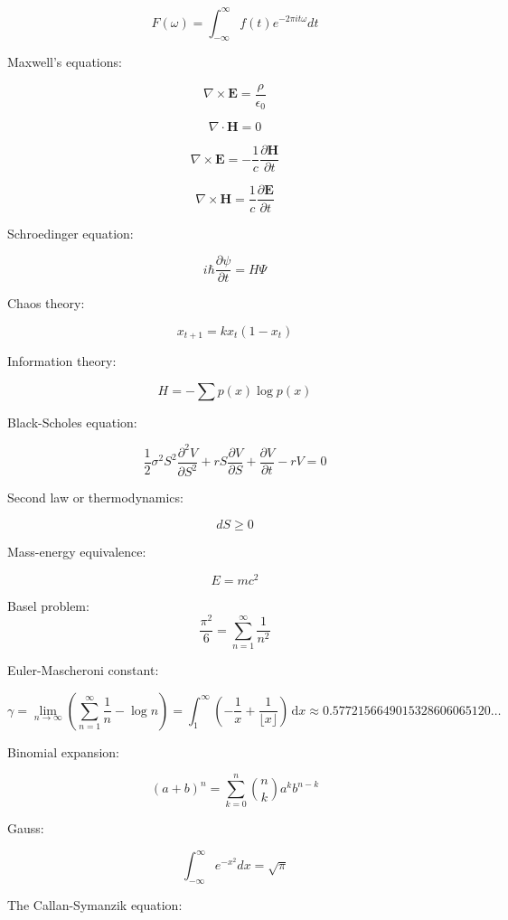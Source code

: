 \documentclass{article}
\begin{document}
\[
  F(\omega) = \int_{-\infty}^\infty f(t) e^{-2\pi i t \omega} dt
\]

Maxwell's equations: 

\begin{equation}
\nabla \times \textbf{E}=\frac{\rho}{\epsilon_0}
\end{equation}

\begin{equation*}
\nabla \cdot \textbf{H}=0
\end{equation*}

\begin{equation*}
\nabla \times \textbf{E}=-\frac 1c\frac{\partial \textbf{H}}{\partial t}
\end{equation*}

\begin{equation*}
\nabla \times \textbf{H}=\frac 1c\frac{\partial \textbf{E}}{\partial t}
\end{equation*}

Schroedinger equation:

\[
i \hbar \frac{\partial \psi}{\partial t} = H\Psi
\]

Chaos theory:

$$x_{t+1}=kx_t(1-x_t)$$

Information theory:

\[
  H=-\sum p(x)\log p(x)
\]

Black-Scholes equation:

$$\frac12\sigma^2S^2\frac{\partial^2V}{\partial S^2}+rS\frac{\partial V}{\partial S}+\frac{\partial V}{\partial t}-rV=0$$

Second law or thermodynamics:

$$dS\ge 0$$

Mass-energy equivalence:

$$E=mc^2$$

Basel problem:
\[
  \frac{\pi^2}{6}=\sum_{n=1}^\infty \frac{1}{n^2}
\]

Euler-Mascheroni constant:

\[
\gamma = \lim_{n\to\infty}(\sum_{n=1}^\infty \frac{1}{n}-\log n)=\int_1^\infty\left(-\frac1x+\frac1{\lfloor x\rfloor}\right)\,\mathrm dx\approx 0.5772156649015328606065120\ldots
\]

Binomial expansion:

\[
(a+b)^n = \sum_{k=0}^n \binom{n}{k} a^k b^{n-k}  
\]

Gauss:

$$\int_{-\infty}^\infty e^{-x^2} dx = \sqrt{\pi}$$

The Callan-Symanzik equation:
\end{document}
